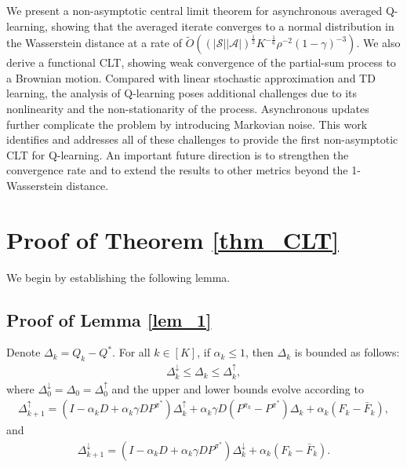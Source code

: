 \documentclass{opt2025} %
\begin{document}
We present a non-asymptotic central limit theorem for asynchronous averaged Q-learning, showing that the averaged iterate converges to a normal distribution in the Wasserstein distance at a rate of $\tilde{O}\left( {({|\mathcal{S}||\mathcal{A}|})^{\frac{1}{2}}}{K^{-\frac{1}{6}}\rho^{-2}(1-\gamma)^{-3}} \right)$. We also derive a functional CLT, showing weak convergence of the partial-sum process to a Brownian motion. Compared with linear stochastic approximation and TD learning, the analysis of Q-learning poses additional challenges due to its nonlinearity and the non-stationarity of the process. Asynchronous updates further complicate the problem by introducing Markovian noise. This work identifies and addresses all of these challenges to provide the first non-asymptotic CLT for Q-learning. An important future direction is to strengthen the convergence rate and to extend the results to other metrics beyond the 1-Wasserstein distance.





\appendix

\newpage

\section{Proof of Theorem \ref{thm_CLT}}


We begin by establishing the following lemma. 

\subsection{Proof of Lemma \ref{lem_1}}

\begin{lemma}
\label{lem_1}
Denote $\Delta_k = Q_k - Q^*$. For all $k \in [K]$, if $\alpha_k \leq 1$, then $\Delta_k$ is bounded as follows:
\begin{align*}
\Delta^{\downarrow}_k \leq \Delta_k \leq \Delta^{\uparrow}_k,
\end{align*}
where $\Delta^{\downarrow}_0 = \Delta_0 = \Delta^{\uparrow}_0$ and the upper and lower bounds evolve according to
\begin{align*}
\Delta^{\uparrow}_{k+1} = (I - \alpha_kD + \alpha_k \gamma D P^{\pi^*})\Delta^{\uparrow}_k + \alpha_k \gamma D(P^{\pi_k}-P^{\pi^*} )\Delta_k  + \alpha_k(F_k - \bar{F}_k),
\end{align*}
and
\begin{align*}
\Delta^{\downarrow}_{k+1} = (I - \alpha_kD + \alpha_k \gamma D P^{\pi^*})\Delta^{\downarrow}_k  + \alpha_k(F_k - \bar{F}_k).
\end{align*}
\end{lemma}
\end{document}

